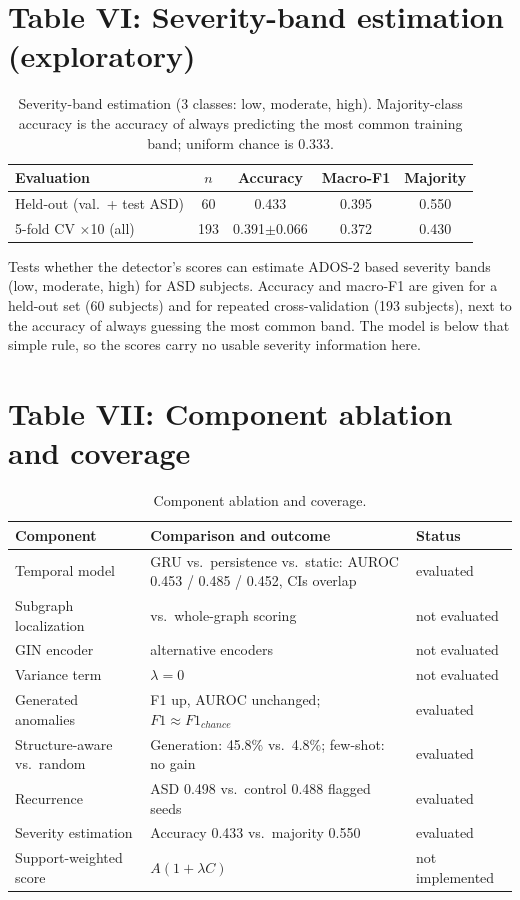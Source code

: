 \documentclass[11pt]{article}
\begin{document}
\bigskip
\section*{Table VI: Severity-band estimation (exploratory)}
\begin{table}[!tbp]
\caption{Severity-band estimation (3 classes: low, moderate, high). Majority-class accuracy is the accuracy of always predicting the most common training band; uniform chance is 0.333.}
\label{tab:severity}
\centering\footnotesize
\begin{tabular}{@{}lcccc@{}}
\toprule
Evaluation & $n$ & Accuracy & Macro-F1 & Majority \\
\midrule
Held-out (val.\ + test ASD) & 60 & 0.433 & 0.395 & 0.550 \\
5-fold CV $\times$10 (all) & 193 & 0.391$\pm$0.066 & 0.372 & 0.430 \\
\bottomrule
\end{tabular}
\end{table}

\smallskip
Tests whether the detector's scores can estimate ADOS-2 based severity bands (low, moderate, high) for ASD subjects. Accuracy and macro-F1 are given for a held-out set (60 subjects) and for repeated cross-validation (193 subjects), next to the accuracy of always guessing the most common band. The model is below that simple rule, so the scores carry no usable severity information here.

\bigskip
\section*{Table VII: Component ablation and coverage}
\begin{table}[!tbp]
\caption{Component ablation and coverage.}
\label{tab:ablation}
\centering\footnotesize
\setlength{\tabcolsep}{3pt}
\begin{tabular}{@{}p{2.25cm}p{3.6cm}p{1.7cm}@{}}
\toprule
Component & Comparison and outcome & Status \\
\midrule
Temporal model & GRU vs.\ persistence vs.\ static: AUROC 0.453 / 0.485 / 0.452, CIs overlap & evaluated \\
Subgraph localization & vs.\ whole-graph scoring & not evaluated \\
GIN encoder & alternative encoders & not evaluated \\
Variance term & $\lambda{=}0$ & not evaluated \\
Generated anomalies & F1 up, AUROC unchanged; $F1\approx F1_{chance}$ & evaluated \\
Structure-aware vs.\ random & Generation: 45.8\% vs.\ 4.8\%; few-shot: no gain & evaluated \\
Recurrence & ASD 0.498 vs.\ control 0.488 flagged seeds & evaluated \\
Severity estimation & Accuracy 0.433 vs.\ majority 0.550 & evaluated \\
Support-weighted score & $A(1{+}\lambda C)$ & not implemented \\
\bottomrule
\end{tabular}
\end{table}
\end{document}
